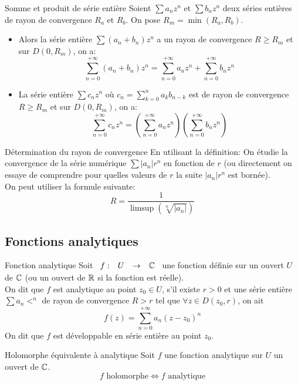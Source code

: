 \documentclass[]{report}
\begin{document}
\begin{prop}{Somme et produit de série entière}{}
    Soient $\sum a_n z^n$ et $ \sum b_n z^n$ deux séries entières de rayon de convergence $R_a$ et $R_b$. On pose $R_m=\min(R_a,R_b)$.
    \begin{itemize}
        \item Alors la série entière $\sum (a_n+b_n)z^n$ a un rayon de convergence $R\ge R_m$ et sur $D(0,R_m)$, on a:
        \[\sum_{n=0}^{+\infty}(a_n+b_n)z^n=\sum_{n=0}^{+\infty} a_n z^n+\sum_{n=0}^{+\infty} b_n z^n\]
        \item La série entière $\sum c_n z^n$ où  $c_n=\sum_{k=0}^{n} a_k b_{n-k}$ est de rayon de convergence $R\ge R_m$ et sur $D(0,R_m)$, on a:
        \[\sum_{n=0}^{+\infty} c_n z^n=\left(\sum_{n=0}^{+\infty} a_n z^n\right)\left(\sum_{n=0}^{+\infty} b_n z^n\right)\]
    \end{itemize}
\end{prop}

\begin{re}{Détermination du rayon de convergence}{}
    En utilisant la définition: On étudie la convergence de la série numérique $\sum |a_n| r^n$ en fonction de $r$ (ou directement on essaye de comprendre pour quelles valeurs de $r$ la suite $|a_n|r^n$ est bornée).\\
    On peut utiliser la formule suivante:
    \[R=\frac{1}{\limsup\left( \sqrt[n]{|a_n|}\right)}\]
\end{re}

\subsection{Fonctions analytiques}

\begin{df}{Fonction analytique}{}
    Soit $\begin{array}{ccccc} f : & U & \to & \mathbb{C} \end{array}$ une fonction définie sur un ouvert $U$ de $\mathbb{C}$ (ou un ouvert de $\mathbb{R}$ si la fonction est réelle).\\
    On dit que $f$ est analytique au point $z_0\in U$, s'il existe $r>0$ et une série entière $\sum a_n <^n$ de rayon de convergence $R>r$ tel que $\forall z\in D(z_0,r)$, on ait
    \[f(z)=\sum_{n=0}^{+\infty} a_n (z-z_0)^n\]
    On dit que $f$ est développable en série entière au point $z_0$.
\end{df}

\begin{tm}{Holomorphe équivalente à analytique}{}
    Soit $f$ une fonction analytique sur $U$ un ouvert de $\mathbb{C}$.
    \[f\text{ holomorphe}\iff f\text{ analytique}\]
\end{tm}
\end{document}
